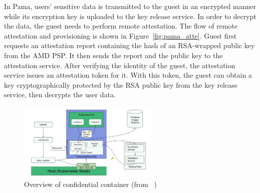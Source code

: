 In Pama, users' sensitive data is transmitted to the guest in an encrypted manner while its encryption key is uploaded to the key release service. In order to decrypt the data, the guest needs to perform remote attestation. The flow of remote attestation and provisioning 
is shown in Figure~\ref{fig:pama_atte}. Guest first requests an attestation report containing the hash of an RSA-wrapped public key from the AMD PSP. It then sends the report and the public key to the attestation service. After verifying the identity of the guest, 
the attestation service issues an attestation token for it. With this token, the guest can obtain a key cryptographically protected by the RSA public key from the key release service, then decrypts the user data.

 
\begin{figure}[htp]
    \centering
    \includegraphics[width=0.6\textwidth]{images/confidentail_kata.png}
    \caption[Overview of confidential container]{Overview of confidential container (from ~\cite*{confidential_kata})}
    \label{fig:confidentail_kata}
\end{figure}

